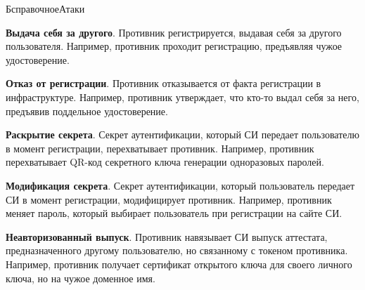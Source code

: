 \begin{appendix}{Б}{справочное}{Атаки}\label{ATK}

\label{ATK.UR}

{\bf Выдача себя за другого}. 
Противник регистрируется, выдавая себя за другого пользователя.
Например, противник проходит регистрацию, предъявляя чужое удостоверение.  


{\bf Отказ от регистрации}. 
Противник отказывается от факта регистрации в инфраструктуре.
Например, противник утверждает, что кто-то выдал себя за него,
предъявив поддельное удостоверение.


{\bf Раскрытие секрета}. 
Секрет аутентификации, который СИ передает пользователю в момент 
регистрации, перехватывает противник. Например, противник перехватывает  
QR-код секретного ключа генерации одноразовых паролей.


{\bf Модификация секрета}. 
Секрет аутентификации, который пользователь передает СИ в момент 
регистрации, модифицирует противник.  
Например, противник меняет пароль, который выбирает пользователь при 
регистрации на сайте СИ. 


{\bf Неавторизованный выпуск}. 
Противник навязывает СИ выпуск аттестата, 
предназначенного другому пользователю, но связанному с токеном противника.
%
Например, противник получает сертификат открытого ключа 
для своего личного ключа, но на чужое доменное имя. 



\end{appendix}

